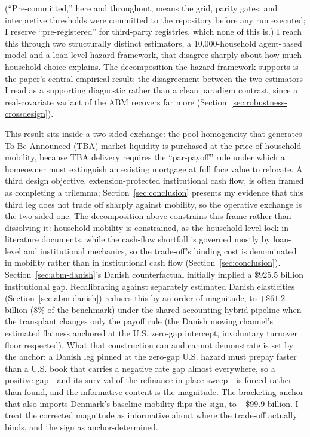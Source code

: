 \documentclass[12pt]{article}
\begin{document}
(``Pre-committed,'' here and throughout, means the grid, parity gates, and interpretive thresholds were committed to the repository before any run executed; I reserve ``pre-registered'' for third-party registries, which none of this is.) I reach this through two structurally distinct estimators, a 10,000-household agent-based model and a loan-level hazard framework, that disagree sharply about how much household choice explains. The decomposition the hazard framework supports is the paper's central empirical result; the disagreement between the two estimators I read as a supporting diagnostic rather than a clean paradigm contrast, since a real-covariate variant of the ABM recovers far more (Section~\ref{sec:robustness-crossdesign}).

This result sits inside a two-sided exchange: the pool homogeneity that generates To-Be-Announced (TBA) market liquidity is purchased at the price of household mobility, because TBA delivery requires the ``par-payoff'' rule under which a homeowner must extinguish an existing mortgage at full face value to relocate. A third design objective, extension-protected institutional cash flow, is often framed as completing a trilemma; Section~\ref{sec:conclusion} presents my evidence that this third leg does not trade off sharply against mobility, so the operative exchange is the two-sided one. The decomposition above constrains this frame rather than dissolving it: household mobility is constrained, as the household-level lock-in literature documents, while the cash-flow shortfall is governed mostly by loan-level and institutional mechanics, so the trade-off's binding cost is denominated in mobility rather than in institutional cash flow (Section~\ref{sec:conclusion}). Section~\ref{sec:abm-danish}'s Danish counterfactual initially implied a \$925.5 billion institutional gap. Recalibrating against separately estimated Danish elasticities (Section~\ref{sec:abm-danish}) reduces this by an order of magnitude, to $+\$61.2$ billion (8\% of the benchmark) under the shared-accounting hybrid pipeline when the transplant changes only the payoff rule (the Danish moving channel's estimated flatness anchored at the U.S. zero-gap intercept, involuntary turnover floor respected). What that construction can and cannot demonstrate is set by the anchor: a Danish leg pinned at the zero-gap U.S. hazard must prepay faster than a U.S. book that carries a negative rate gap almost everywhere, so a positive gap---and its survival of the refinance-in-place sweep---is forced rather than found, and the informative content is the magnitude. The bracketing anchor that also imports Denmark's baseline mobility flips the sign, to $-\$99.9$ billion. I treat the corrected magnitude as informative about where the trade-off actually binds, and the sign as anchor-determined.
\end{document}
